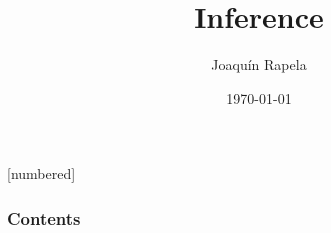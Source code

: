 
\usepackage{setspace}

\newtheorem{probDef}{Definition}
\newtheorem*{probDef*}{Definition}
\newtheorem{claim}{Claim}
\newtheorem*{claim*}{Claim}
\newtheorem{probExample}{Example}
\newtheorem{probRule}{Rule}
\newtheorem{probAxiom}{Axiom}
[numbered]

\newtheorem{manualprobRuleinner}{Rule}
\newenvironment{manualProbRule}[1]{%
  \renewcommand\themanualprobRuleinner{#1}%
  \manualprobRuleinner
}{\endmanualprobRuleinner}

\newtheorem{manualprobExampleinner}{Example}
\newenvironment{manualProbExample}[1]{%
  \renewcommand\themanualprobExampleinner{#1}%
  \manualprobExampleinner
}{\endmanualprobExampleinner}

\newcommand{\seti}{\setcounter{saveenumi}{\value{enumi}}}
\newcommand{\conti}{\setcounter{enumi}{\value{saveenumi}}}
\newcommand{\keepi}{\addtocounter{saveenumi}{-1}\setcounter{enumi}{\value{saveenumi}}}


\title{Inference}

\author{Joaqu\'{i}n Rapela} %
\date{\today} %




\begin{frame}
\titlepage %
\end{frame}

\begin{frame}
\frametitle{Contents} %
\tableofcontents %
\end{frame}

